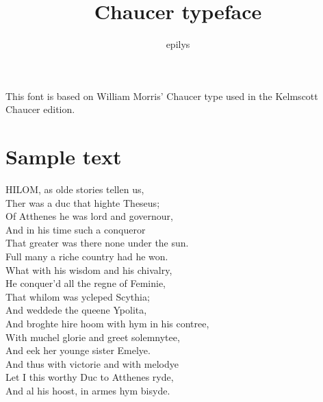 \documentclass{article}
\title{Chaucer typeface}
\author{epilys}
\begin{document}
\maketitle
This font is based on William Morris' Chaucer type used in the Kelmscott Chaucer edition.
\section*{Sample text}%
\reversemarginpar{}%
\marginpar{\textcolor{sidered}{\\ \\ The\\ Knyghtes\\ Tale}}%
\begin{multicols}{2}%
HILOM, as olde stories tellen us,\\
Ther was a duc that highte Theseus;\\
Of Atthenes he was lord and governour,\\
And in his time such a conqueror\\
That greater was there none under the sun.\\
Full many a riche country had he won.\\
What with his wisdom and his chivalry,\\
He conquer'd all the regne of Feminie,\\
That whilom was ycleped Scythia;\\
And weddede the queene Ypolita,\\
And broghte hire hoom with hym in his contree,\\
With muchel glorie and greet solemnytee,\\
And eek her younge sister Emelye.\\
And thus with victorie and with melodye\\
Let I this worthy Duc to Atthenes ryde,\\
And al his hoost, in armes hym bisyde.
\columnbreak%


\end{multicols}
\end{document}
